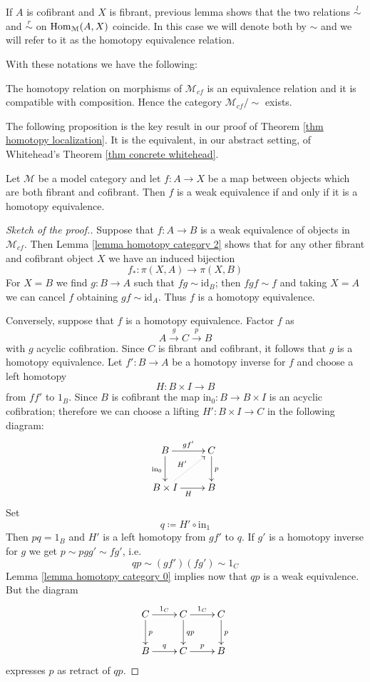\begin{refsection}
\begin{notation}
If $A$ is cofibrant and $X$ is fibrant, previous lemma shows that the two relations $\stackrel{l}{\sim}$ and $\stackrel{r}{\sim}$ on $\mathrm{Hom}_{\mathcal M}(A,X)$ coincide. In this case we will denote both by $\sim$ and we will refer to it as the homotopy equivalence relation.
\end{notation}

With these notations we have the following:

\begin{cor} \label{cor weak homotopy category}
The homotopy relation on morphisms of $\mathcal M_{cf}$ is an equivalence relation and it is compatible with composition. Hence the category $\mathcal M_{cf} / \sim$ exists.
\end{cor}

The following proposition is the key result in our proof of Theorem \ref{thm homotopy localization}. It is the equivalent, in our abstract setting, of Whitehead's Theorem \ref{thm concrete whitehead}.

\begin{thm} \label{thm abstract whitehead}
Let $\mathcal M$ be a model category and let $f \colon A \to X$ be a map between objects which are both fibrant and cofibrant. Then $f$ is a weak equivalence if and only if it is a homotopy equivalence.
\end{thm}

\begin{proof}[Sketch of the proof.]
Suppose that $f \colon A \to B$ is a weak equivalence of objects in $\mathcal M_{cf}$. Then Lemma \ref{lemma homotopy category 2} shows that for any other fibrant and cofibrant object $X$ we have an induced bijection
\[
f_* \colon \pi(X,A) \to \pi(X,B)
\]
For $X = B$ we find $g \colon B \to A$ such that $fg \sim \mathrm{id}_B$; then $fgf \sim f$ and taking $X = A$ we can cancel $f$ obtaining $gf \sim \mathrm{id}_A$. Thus $f$ is a homotopy equivalence.

Conversely, suppose that $f$ is a homotopy equivalence. Factor $f$ as
\[
A \xrightarrow{g} C \xrightarrow{p} B
\]
with $g$ acyclic cofibration. Since $C$ is fibrant and cofibrant, it follows that $g$ is a homotopy equivalence. Let $f' \colon B \to A$ be a homotopy inverse for $f$ and choose a left homotopy
\[
H \colon B \times I \to B
\]
from $ff'$ to $1_B$. Since $B$ is cofibrant the map $\mathrm{in}_0 \colon B \to B \times I$ is an acyclic cofibration; therefore we can choose a lifting $H' \colon B \times I \to C$ in the following diagram:
\[
\xymatrix{
B \ar[d]_{\mathrm{in}_0} \ar[r]^{gf'} & C \ar[d]^p \\ B \times I \ar@{.>}[ur]^{H'} \ar[r]_H & B
}
\]
Set
\[
q\coloneqq H' \circ \mathrm{in}_1
\]
Then $pq = 1_B$ and $H'$ is a left homotopy from $gf'$ to $q$. If $g'$ is a homotopy inverse for $g$ we get $p \sim pgg' \sim fg'$, i.e.
\[
qp \sim (gf') (fg') \sim 1_C
\]
Lemma \ref{lemma homotopy category 0} implies now that $qp$ is a weak equivalence. But the diagram
\[
\xymatrix{
C \ar[r]^{1_C} \ar[d]^p & C \ar[r]^{1_C} \ar[d]^{qp} & C \ar[d]^p \\ B \ar[r]^q & C \ar[r]^p & B
}
\]
expresses $p$ as retract of $qp$.
\end{proof}


\end{refsection}
